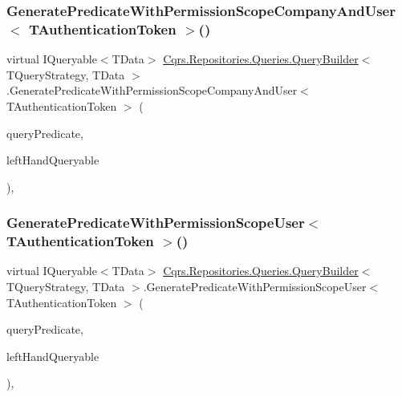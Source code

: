 \subsubsection{\texorpdfstring{Generate\+Predicate\+With\+Permission\+Scope\+Company\+And\+User$<$ T\+Authentication\+Token $>$()}{GeneratePredicateWithPermissionScopeCompanyAndUser< TAuthenticationToken >()}}
{\footnotesize\ttfamily virtual I\+Queryable$<$T\+Data$>$ \hyperlink{classCqrs_1_1Repositories_1_1Queries_1_1QueryBuilder}{Cqrs.\+Repositories.\+Queries.\+Query\+Builder}$<$ T\+Query\+Strategy, T\+Data $>$.Generate\+Predicate\+With\+Permission\+Scope\+Company\+And\+User$<$ T\+Authentication\+Token $>$ (\begin{DoxyParamCaption}\item[{\hyperlink{classCqrs_1_1Repositories_1_1Queries_1_1QueryPredicate}{Query\+Predicate}}]{query\+Predicate,  }\item[{I\+Queryable$<$ T\+Data $>$}]{left\+Hand\+Queryable }\end{DoxyParamCaption})\hspace{0.3cm}{\ttfamily [protected]}, {\ttfamily [virtual]}}

\mbox{\label{classCqrs_1_1Repositories_1_1Queries_1_1QueryBuilder_a027cb88563991a842002c219d7589426_a027cb88563991a842002c219d7589426}} 
\subsubsection{\texorpdfstring{Generate\+Predicate\+With\+Permission\+Scope\+User$<$ T\+Authentication\+Token $>$()}{GeneratePredicateWithPermissionScopeUser< TAuthenticationToken >()}}
{\footnotesize\ttfamily virtual I\+Queryable$<$T\+Data$>$ \hyperlink{classCqrs_1_1Repositories_1_1Queries_1_1QueryBuilder}{Cqrs.\+Repositories.\+Queries.\+Query\+Builder}$<$ T\+Query\+Strategy, T\+Data $>$.Generate\+Predicate\+With\+Permission\+Scope\+User$<$ T\+Authentication\+Token $>$ (\begin{DoxyParamCaption}\item[{\hyperlink{classCqrs_1_1Repositories_1_1Queries_1_1QueryPredicate}{Query\+Predicate}}]{query\+Predicate,  }\item[{I\+Queryable$<$ T\+Data $>$}]{left\+Hand\+Queryable }\end{DoxyParamCaption})\hspace{0.3cm}{\ttfamily [protected]}, {\ttfamily [virtual]}}

